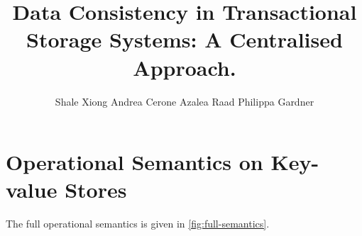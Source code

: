 \documentclass[runningheads]{llncs}
\newcommand{\RootPath}{.}
\newif\ifTechReport
\begin{document}
\title{
	Data Consistency in Transactional Storage Systems: A Centralised Approach. 
    } 

\author{%
Shale Xiong
Andrea Cerone
Azalea Raad
Philippa Gardner
}
%


%

\maketitle

\begin{abstract}
    
\end{abstract}








%




\newpage
\appendix
\ifTechReport
\else
\section{Operational Semantics on Key-value Stores}
\label{sec:full-semantics}
The full operational semantics is given in \cref{fig:full-semantics}.






\end{document}
